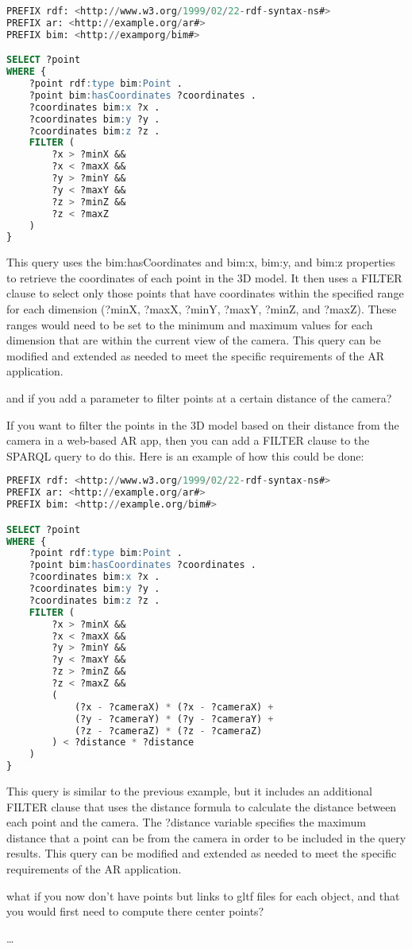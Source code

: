\begin{description}
	\begin{lstlisting}[language=SQL]
PREFIX rdf: <http://www.w3.org/1999/02/22-rdf-syntax-ns#>
PREFIX ar: <http://example.org/ar#>
PREFIX bim: <http://examporg/bim#>

SELECT ?point
WHERE {
    ?point rdf:type bim:Point .
    ?point bim:hasCoordinates ?coordinates .
    ?coordinates bim:x ?x .
    ?coordinates bim:y ?y .
    ?coordinates bim:z ?z .
    FILTER (
        ?x > ?minX &&
        ?x < ?maxX &&
        ?y > ?minY &&
        ?y < ?maxY &&
        ?z > ?minZ &&
        ?z < ?maxZ
    )
}
\end{lstlisting}

	This query uses the bim:hasCoordinates and bim:x, bim:y, and bim:z properties to retrieve the coordinates of each point in the 3D model. It then uses a FILTER clause to select only those points that have coordinates within the specified range for each dimension (?minX, ?maxX, ?minY, ?maxY, ?minZ, and ?maxZ). These ranges would need to be set to the minimum and maximum values for each dimension that are within the current view of the camera. This query can be modified and extended as needed to meet the specific requirements of the AR application.

	\me and if you add a parameter to filter points at a certain distance of the camera?

	\gpt If you want to filter the points in the 3D model based on their distance from the camera in a web-based AR app, then you can add a FILTER clause to the SPARQL query to do this. Here is an example of how this could be done:

	\begin{lstlisting}[language=SQL]
PREFIX rdf: <http://www.w3.org/1999/02/22-rdf-syntax-ns#>
PREFIX ar: <http://example.org/ar#>
PREFIX bim: <http://example.org/bim#>

SELECT ?point
WHERE {
    ?point rdf:type bim:Point .
    ?point bim:hasCoordinates ?coordinates .
    ?coordinates bim:x ?x .
    ?coordinates bim:y ?y .
    ?coordinates bim:z ?z .
    FILTER (
        ?x > ?minX &&
        ?x < ?maxX &&
        ?y > ?minY &&
        ?y < ?maxY &&
        ?z > ?minZ &&
        ?z < ?maxZ &&
        (
            (?x - ?cameraX) * (?x - ?cameraX) +
            (?y - ?cameraY) * (?y - ?cameraY) +
            (?z - ?cameraZ) * (?z - ?cameraZ)
        ) < ?distance * ?distance
    )
}    
\end{lstlisting}

	This query is similar to the previous example, but it includes an additional FILTER clause that uses the distance formula to calculate the distance between each point and the camera. The ?distance variable specifies the maximum distance that a point can be from the camera in order to be included in the query results. This query can be modified and extended as needed to meet the specific requirements of the AR application.

	\me what if you now don't have points but links to gltf files for each object, and that you would first need to compute there center points?

	\dots
\end{description}